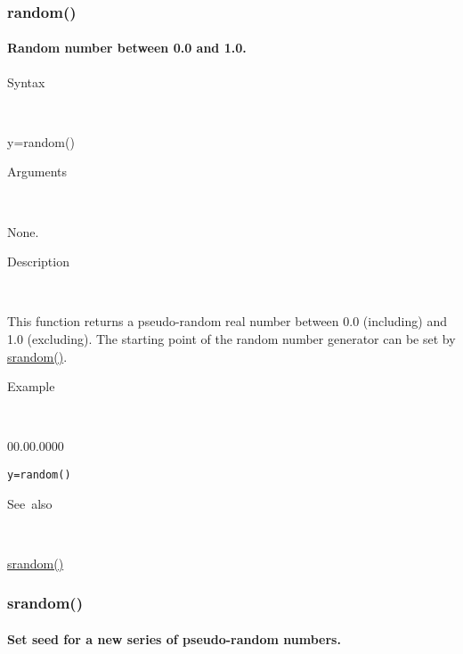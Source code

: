 \newpage
\subsubsection*{\hypertarget{random}{}{\Large random()}}


\paragraph{\label{par:random}Random number between 0.0 and 1.0.}

\begin{description}
\item [Syntax]~
\end{description}
y=random()

\begin{description}
\item [Arguments]~
\end{description}
None.

\begin{description}
\item [Description]~
\end{description}
This function returns a pseudo-random real number between 0.0 (including) and 1.0 (excluding).
The starting point of the random number generator can be set by \textcolor{blue}{\hyperlink{srandom}{srandom()}}.

\begin{description}
\item [Example]~
\end{description}
\begin{lyxlist}{00.00.0000}
\item [\texttt{y=random()}]
\end{lyxlist}
\begin{description}
\item [See~also]~
\end{description}
\textcolor{blue}{\hyperlink{srandom}{srandom()}}

\newpage
\subsubsection*{\hypertarget{srandom}{}{\Large srandom()}}


\paragraph{\label{par:srandom}Set seed for a new series of pseudo-random numbers.}

